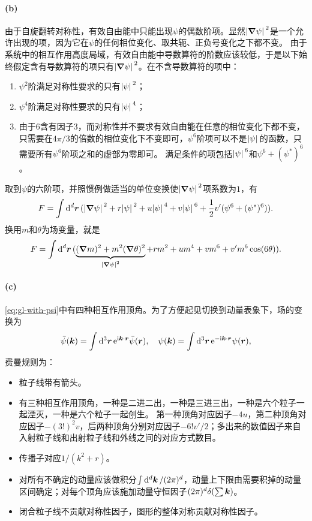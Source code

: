 \documentclass[hyperref, UTF8, a4paper]{ctexart}
\newcommand*{\ii}{\mathrm{i}}
\newcommand*{\ee}{\mathrm{e}}
\begin{document}
\paragraph{(b)} 由于自旋翻转对称性，有效自由能中只能出现$\psi$的偶数阶项。显然$\abs*{\grad{\psi}}^2$是一个允许出现的项，因为它在$\psi$的任何相位变化、取共轭、正负号变化之下都不变。
由于系统中的相互作用高度局域，有效自由能中导数算符的阶数应该较低，于是以下始终假定含有导数算符的项只有$\abs*{\grad{\psi}}^2$。在不含导数算符的项中：
\begin{enumerate}
    \item $\psi^2$阶满足对称性要求的只有$\abs*{\psi}^2$；
    \item $\psi^4$阶满足对称性要求的只有$\abs*{\psi}^4$；
    \item 由于$6$含有因子$3$，而对称性并不要求有效自由能在任意的相位变化下都不变，只需要在$4 \pi / 3$的倍数的相位变化下不变即可，$\psi^6$阶项可以不是$\abs*{\psi}$的函数，只需要所有$\psi^6$阶项之和的虚部为零即可。
    满足条件的项包括$\abs*{\psi}^6$和$\psi^6 + (\psi^*)^6$。
\end{enumerate}
取到$\psi$的六阶项，并照惯例做适当的单位变换使$\abs*{\grad{\psi}}^2$项系数为$1$，有
\begin{equation}
    F = \int \dd[d]{\vb*{r}} (\abs*{\grad{\psi}}^2 + r \abs*{\psi}^2 + u \abs*{\psi}^4 + v \abs*{\psi}^6 + \frac{1}{2} v' (\psi^6 + (\psi^*)^6)).
    \label{eq:gl-with-psi}
\end{equation}
换用$m$和$\theta$为场变量，就是
\begin{equation}
    F = \int \dd[d]{\vb*{r}} (\underbrace{(\grad{m})^2 + m^2 (\grad{\theta})^2}_{\abs*{\grad{\psi}}^2} + r m^2 + u m^4 + v m^6 + v' m^6 \cos(6 \theta)).
\end{equation}

\paragraph{(c)} \eqref{eq:gl-with-psi}中有四种相互作用顶角。为了方便起见切换到动量表象下，场的变换为
\[
    \bar{\psi}(\vb*{k}) = \int \dd[3]{\vb*{r}} \ee^{\ii \vb*{k} \cdot \vb*{r}} \bar{\psi}(\vb*{r}), \quad \psi(\vb*{k}) = \int \dd[3]{\vb*{r}} \ee^{- \ii \vb*{k} \cdot \vb*{r}} \psi(\vb*{r}),
\]
费曼规则为：
\begin{itemize}
    \item 粒子线带有箭头。
    \item 有三种相互作用顶角，一种是二进二出，一种是三进三出，一种是六个粒子一起湮灭，一种是六个粒子一起创生。
    第一种顶角对应因子$-4u$，第二种顶角对应因子$-(3!)^2 v$，后两种顶角分别对应因子$-6! v'/2$；多出来的数值因子来自入射粒子线和出射粒子线和外线之间的对应方式数目。
    \item 传播子对应$1/(k^2+r)$。
    \item 对所有不确定的动量应该做积分$\int \dd[d]{\vb*{k}} / (2\pi)^d$，动量上下限由需要积掉的动量区间确定；对每个顶角应该施加动量守恒因子$(2\pi)^d \delta(\sum \vb*{k})$。
    \item 闭合粒子线不贡献对称性因子，图形的整体对称贡献对称性因子。
\end{itemize}
\end{document}

